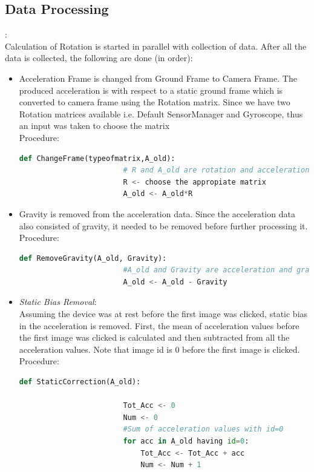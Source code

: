 \documentclass{article}
\begin{document}
			\subsection{Data Processing}:\\ Calculation of Rotation is started in parallel with collection of data. After all the data is collected, the following are done (in order):
				\begin{itemize}
				\item Acceleration Frame is changed from Ground Frame to Camera Frame. The produced acceleration is with respect to a static ground frame which is converted to camera frame using the Rotation matrix. Since we have two Rotation matrices available i.e. Default SensorManager and Gyroscope, thus an input was taken to choose the matrix
				\\ Procedure:
				\begin{lstlisting}[language=Python, caption=ChangeFrame()]
					def ChangeFrame(typeofmatrix,A_old):
						# R and A_old are rotation and acceleration matrices respectively
						R <- choose the appropiate matrix
						A_old <- A_old*R
				\end{lstlisting}
				\item Gravity is removed from the acceleration data. Since the acceleration data also consisted of gravity, it needed to be removed before further processing it.
				\\ Procedure:
				\begin{lstlisting}[language=Python, caption=RemoveGravity()]
					def RemoveGravity(A_old, Gravity):
						#A_old and Gravity are acceleration and gravity matrices respectively
						A_old <- A_old - Gravity
				\end{lstlisting}
				\item \textit{Static Bias Removal}:\\Assuming the device was at rest before the first image was clicked, static bias in the acceleration is removed. First, the mean of acceleration values before the first image was clicked is calculated and then subtracted from all the acceleration values. Note that image id is 0 before the first image is clicked.
				\\ Procedure:
				\begin{lstlisting}[language=Python, caption=StaticCorrection()]
					def StaticCorrection(A_old):

						Tot_Acc <- 0
						Num <- 0
						#Sum of acceleration values with id=0
						for acc in A_old having id=0:
							Tot_Acc <- Tot_Acc + acc
							Num <- Num + 1


\end{lstlisting}
\end{itemize}
\end{document}

